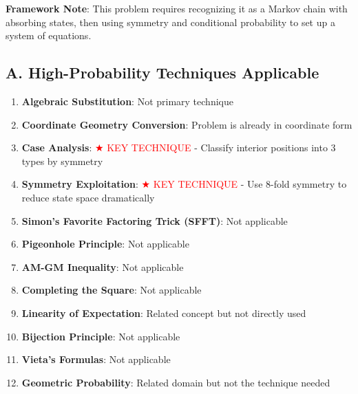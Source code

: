 \documentclass[12pt]{article}
\begin{document}
\begin{techniquesbox}

\textbf{Framework Note}: This problem requires recognizing it as a Markov chain with absorbing states, then using symmetry and conditional probability to set up a system of equations.

\subsection*{A. High-Probability Techniques Applicable}
\begin{enumerate}[leftmargin=*]
    \item \textbf{Algebraic Substitution}: Not primary technique
    
    \item \textbf{Coordinate Geometry Conversion}: Problem is already in coordinate form
    
    \item \textbf{Case Analysis}: \textcolor{red}{$\bigstar$ KEY TECHNIQUE} - Classify interior positions into 3 types by symmetry
    
    \item \textbf{Symmetry Exploitation}: \textcolor{red}{$\bigstar$ KEY TECHNIQUE} - Use 8-fold symmetry to reduce state space dramatically
    
    \item \textbf{Simon's Favorite Factoring Trick (SFFT)}: Not applicable
    
    \item \textbf{Pigeonhole Principle}: Not applicable
    
    \item \textbf{AM-GM Inequality}: Not applicable
    
    \item \textbf{Completing the Square}: Not applicable
    
    \item \textbf{Linearity of Expectation}: Related concept but not directly used
    
    \item \textbf{Bijection Principle}: Not applicable
    
    \item \textbf{Vieta's Formulas}: Not applicable
    
    \item \textbf{Geometric Probability}: Related domain but not the technique needed
\end{enumerate}


\end{techniquesbox}
\end{document}
